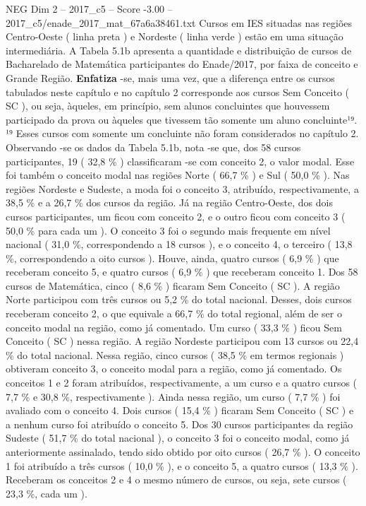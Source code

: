 \begin{textsample}{NEG Dim 2 – 2017\_c5 – Score -3.00 – 2017\_c5/enade\_2017\_mat\_67a6a38461.txt}
Cursos em IES situadas nas regiões Centro-Oeste ( linha preta ) e Nordeste ( linha verde ) estão em uma situação intermediária.
A Tabela 5.1b apresenta a quantidade e distribuição de cursos de Bacharelado de Matemática participantes do Enade/2017, por faixa de conceito e Grande Região. \textbf{Enfatiza} -se, mais uma vez, que a diferença entre os cursos tabulados neste capítulo e no capítulo 2 corresponde aos cursos Sem Conceito ( SC ), ou seja, àqueles, em princípio, sem alunos concluintes que houvessem participado da prova ou àqueles que tivessem tão somente um aluno concluinte¹⁹. ¹⁹ Esses cursos com somente um concluinte não foram considerados no capítulo 2.
Observando -se os dados da Tabela 5.1b, nota -se que, dos 58 cursos participantes, 19 ( 32,8 \% ) classificaram -se com conceito 2, o valor modal.
Esse foi também o conceito modal nas regiões Norte ( 66,7 \% ) e Sul ( 50,0 \% ).
Nas regiões Nordeste e Sudeste, a moda foi o conceito 3, atribuído, respectivamente, a 38,5 \% e a 26,7 \% dos cursos da região.
Já na região Centro-Oeste, dos dois cursos participantes, um ficou com conceito 2, e o outro ficou com conceito 3 ( 50,0 \% para cada um ).
O conceito 3 foi o segundo mais frequente em nível nacional ( 31,0 \%, correspondendo a 18 cursos ), e o conceito 4, o terceiro ( 13,8 \%, correspondendo a oito cursos ).
Houve, ainda, quatro cursos ( 6,9 \% ) que receberam conceito 5, e quatro cursos ( 6,9 \% ) que receberam conceito 1.
Dos 58 cursos de Matemática, cinco ( 8,6 \% ) ficaram Sem Conceito ( SC ).
A região Norte participou com três cursos ou 5,2 \% do total nacional.
Desses, dois cursos receberam conceito 2, o que equivale a 66,7 \% do total regional, além de ser o conceito modal na região, como já comentado.
Um curso ( 33,3 \% ) ficou Sem Conceito ( SC ) nessa região.
A região Nordeste participou com 13 cursos ou 22,4 \% do total nacional.
Nessa região, cinco cursos ( 38,5 \% em termos regionais ) obtiveram conceito 3, o conceito modal para a região, como já comentado.
Os conceitos 1 e 2 foram atribuídos, respectivamente, a um curso e a quatro cursos ( 7,7 \% e 30,8 \%, respectivamente ).
Ainda nessa região, um curso ( 7,7 \% ) foi avaliado com o conceito 4.
Dois cursos ( 15,4 \% ) ficaram Sem Conceito ( SC ) e a nenhum curso foi atribuído o conceito 5.
Dos 30 cursos participantes da região Sudeste ( 51,7 \% do total nacional ), o conceito 3 foi o conceito modal, como já anteriormente assinalado, tendo sido obtido por oito cursos ( 26,7 \% ).
O conceito 1 foi atribuído a três cursos ( 10,0 \% ), e o conceito 5, a quatro cursos ( 13,3 \% ).
Receberam os conceitos 2 e 4 o mesmo número de cursos, ou seja, sete cursos ( 23,3 \%, cada um ).

\end{textsample}
